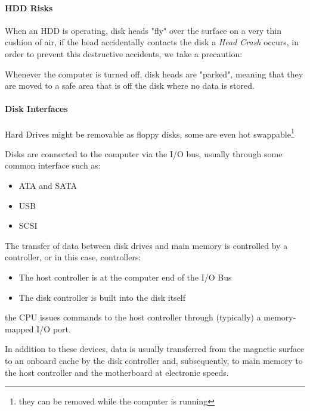 \documentclass[openright, twoside]{report}
\theoremstyle{definition}
\theoremstyle{example}
\begin{document}
\paragraph{HDD Risks}

When an HDD is operating, disk heads "fly" over the surface on a very thin
cushion of air, if the head accidentally contacts the disk a \emph{Head Crash}
occurs, in order to prevent this destructive accidents, we take a precaution:

Whenever the computer is turned off, disk heads are "parked", meaning that they
are moved to a safe area that is off the disk where no data is stored.

\paragraph{Disk Interfaces} %
Hard Drives might be removable as floppy disks, some are even hot swappable\footnote{they can be removed while the computer is running}

Disks are connected to the computer via the I/O bus, usually through some common interface such as:
\begin{multicols}{3}
	\begin{itemize}
		\item ATA and SATA
		\item USB
		\item SCSI
	\end{itemize}
\end{multicols}


The transfer of data between disk drives and main memory is controlled by a controller, %
or in this case, controllers:

\begin{itemize}
	\item The host controller is at the computer end of the I/O Bus
	\item The disk controller is built into the disk itself
\end{itemize}

the CPU issues commands to the host controller through (typically) a memory-mapped I/O port.

In addition to these devices, data is usually transferred from the magnetic surface to an 
onboard cache by the disk controller and, subsequently, to main memory to the host controller
and the motherboard at electronic speeds.
\end{document}
